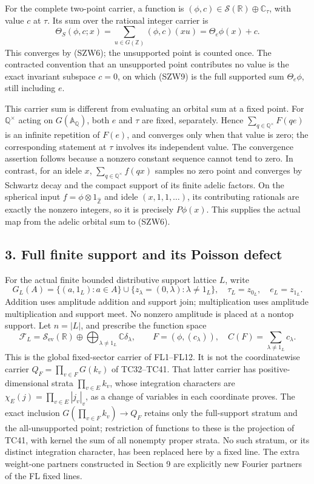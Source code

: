 \documentclass[
  10pt,
  a4paper,
]{article}
\begin{document}
For the complete two-point carrier, a function is
\((\phi,c)\in\mathcal S(\mathbb R)\oplus\mathbb C_\tau\), with value
\(c\) at \(\tau\). Its sum over the rational integer carrier is \[
\Theta_S(\phi,c;x)=\sum_{u\in G(\mathbb Z)}(\phi,c)(xu)
=\Theta_e\phi(x)+c.
\tag{SZW9}
\] This converges by (SZW6); the unsupported point is counted once. The
contracted convention that an unsupported point contributes no value is
the exact invariant subspace \(c=0\), on which (SZW9) is the full
supported sum \(\Theta_e\phi\), still including \(e\).

This carrier sum is different from evaluating an orbital sum at a fixed
point. For \(\mathbb Q^\times\) acting on \(G(\mathbb A_{\mathbb Q})\),
both \(e\) and \(\tau\) are fixed, separately. Hence
\(\sum_{q\in\mathbb Q^\times}F(qe)\) is an infinite repetition of
\(F(e)\), and converges only when that value is zero; the corresponding
statement at \(\tau\) involves its independent value. The convergence
assertion follows because a nonzero constant sequence cannot tend to
zero. In contrast, for an idele \(x\),
\(\sum_{q\in\mathbb Q^\times}f(qx)\) samples no zero point and converges
by Schwartz decay and the compact support of its finite adelic factors.
On the spherical input \(f=\phi\otimes1_{\widehat{\mathbb Z}}\) and
idele \((x,1,1,\ldots)\), its contributing rationals are exactly the
nonzero integers, so it is precisely \(P\phi(x)\). This supplies the
actual map from the adelic orbital sum to (SZW6).

\subsection{3. Full finite support and its Poisson
defect}\label{full-finite-support-and-its-poisson-defect}

For the actual finite bounded distributive support lattice \(L\), write
\[
G_L(A)=\{(a,1_L):a\in A\}\cup\{z_\lambda=(0,\lambda):\lambda\ne1_L\},
\quad \tau_L=z_{0_L},\quad e_L=z_{1_L}.
\tag{SZW10}
\] Addition uses amplitude addition and support join; multiplication
uses amplitude multiplication and support meet. No nonzero amplitude is
placed at a nontop support. Let \(n=|L|\), and prescribe the function
space \[
\mathcal F_L=\mathcal S_{\mathrm{ev}}(\mathbb R)
\oplus\bigoplus_{\lambda\ne1_L}\mathbb C\delta_\lambda,
\qquad F=(\phi,(c_\lambda)),\quad C(F)=\sum_{\lambda\ne1_L}c_\lambda.
\tag{SZW11}
\] This is the global fixed-sector carrier of FL1--FL12. It is not the
coordinatewise carrier \(Q_F=\prod_{v\in F}G(k_v)\) of TC32--TC41. That
latter carrier has positive-dimensional strata \(\prod_{v\in E}k_v\),
whose integration characters are \(\chi_E(j)=\prod_{v\in E}|j_v|_v\), as
a change of variables in each coordinate proves. The exact inclusion
\(G(\prod_{v\in F}k_v)\to Q_F\) retains only the full-support stratum
and the all-unsupported point; restriction of functions to these is the
projection of TC41, with kernel the sum of all nonempty proper strata.
No such stratum, or its distinct integration character, has been
replaced here by a fixed line. The extra weight-one partners constructed
in Section 9 are explicitly new Fourier partners of the FL fixed lines.
\end{document}
